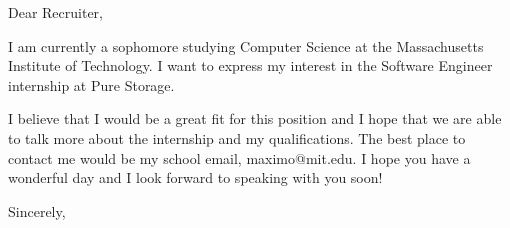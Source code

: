 \documentclass[12pt]{letter}
\begin{document}
\begin{letter}{}
    \opening{Dear Recruiter,}
    I am currently a sophomore studying Computer Science at the Massachusetts Institute of Technology.
    I want to express my interest in the Software Engineer internship at Pure Storage.

    I believe that I would be a great fit for this position and I hope that we are able to talk more about the internship and my qualifications.
    The best place to contact me would be my school email, maximo@mit.edu. I hope you have a wonderful day and I look forward to speaking with you soon!
    \closing{Sincerely,}
\end{letter}
\end{document}
